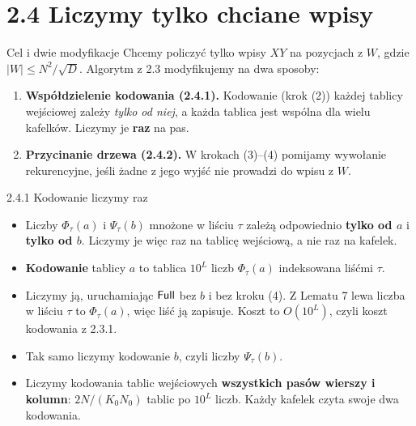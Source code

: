 \section{2.4 Liczymy tylko chciane wpisy}

\begin{frame}{Cel i dwie modyfikacje}
  Chcemy policzyć tylko wpisy $XY$ na pozycjach z $W$, gdzie $|W|\le N^2/\sqrt D$.
  Algorytm z 2.3 modyfikujemy na dwa sposoby:
  \begin{enumerate}
    \item<2-> \textbf{Współdzielenie kodowania (2.4.1).} Kodowanie (krok (2)) każdej tablicy wejściowej zależy
      \emph{tylko od niej}, a każda tablica jest wspólna dla wielu kafelków. Liczymy je \textbf{raz} na pas.
    \item<3-> \textbf{Przycinanie drzewa (2.4.2).} W krokach (3)--(4) pomijamy wywołanie rekurencyjne, jeśli żadne
      z jego wyjść nie prowadzi do wpisu z $W$.
  \end{enumerate}
\end{frame}

\begin{frame}{2.4.1 Kodowanie liczymy raz}
  \begin{itemize}
    \item Liczby $\Phi_\tau(a)$ i $\Psi_\tau(b)$ mnożone w liściu $\tau$ zależą odpowiednio \textbf{tylko od $a$} i \textbf{tylko od $b$}.
      Liczymy je więc raz na tablicę wejściową, a nie raz na kafelek.
    \item<2-> \textbf{Kodowanie} tablicy $a$ to tablica $10^L$ liczb $\Phi_\tau(a)$ indeksowana liśćmi $\tau$.
    \item<3-> Liczymy ją, uruchamiając $\mathsf{Full}$ bez $b$ i bez kroku (4). Z Lematu 7 lewa liczba w liściu $\tau$ to $\Phi_\tau(a)$,
      więc liść ją zapisuje. Koszt to $O(10^L)$, czyli koszt kodowania z 2.3.1.
    \item<3-> Tak samo liczymy kodowanie $b$, czyli liczby $\Psi_\tau(b)$.
    \item<4-> Liczymy kodowania tablic wejściowych \textbf{wszystkich pasów wierszy i kolumn}: $2N/(K_0N_0)$ tablic po $10^L$ liczb.
      Każdy kafelek czyta swoje dwa kodowania.
  \end{itemize}
\end{frame}

